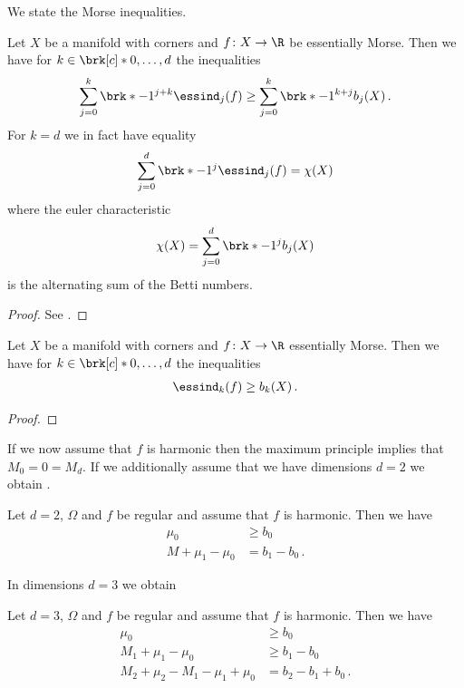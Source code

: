 We state the Morse inequalities.
\begin{theorem}
Let $X$ be a manifold with corners and $f\colon X\to\R$ be essentially Morse.
Then we have for $k\in\brk[c]*{0,\dots,d}$ the inequalities
\begin{align*}
  \sum_{j=0}^k \brk*{-1}^{j+k}\essind_j(f)\geq \sum_{j=0}^k\brk*{-1}^{k+j}b_j(X)\,.
\end{align*}
For $k=d$ we in fact have equality
\begin{align*}
  \sum_{j=0}^d \brk*{-1}^{j}\essind_j(f)= \chi(X)
\end{align*}
where the euler characteristic
\begin{align*}
  \chi(X)=\sum_{j=0}^d\brk*{-1}^{j}b_j(X)
\end{align*}
is the alternating sum of the Betti numbers.
\end{theorem}
\begin{proof}
  See \cite[Theorem 10.2']{Morse1969}.
\end{proof}

\begin{corollary}
  Let $X$ be a manifold with corners and $f\colon X\to\R$ essentially Morse. Then we have for $k\in\brk[c]*{0,\dots,d}$
  the inequalities
  \begin{align*}
    \essind_k(f)\geq b_k(X)\,.
  \end{align*}
\end{corollary}
\begin{proof}
\end{proof}
If we now assume that $f$ is harmonic then the maximum principle implies that
$M_0=0=M_d$.
If we additionally assume that we have dimensions $d=2$ we obtain \cite[Corollary 10.1]{Morse1969}.
\begin{corollary}[Morse inequalities for $f$ harmonic, $d=2$]
  Let $d=2$, $\Omega$ and $f$ be regular and assume that $f$ is harmonic. Then we have
  \begin{align*}
    \mu_0&\geq b_0 \\
    M+\mu_1-\mu_0&=b_1-b_0\,.
  \end{align*}
\end{corollary}
In dimensions $d=3$ we obtain \cite[Corollary 10.2]{Morse1969}
\begin{corollary}[Morse inequalities for $f$ harmonic, $d=3$]
  Let $d=3$, $\Omega$ and $f$ be regular and assume that $f$ is harmonic. Then we have
  \begin{align*}
    \mu_0&\geq b_0 \\
    M_1+\mu_1-\mu_0&\geq b_1-b_0 \\
    M_2+\mu_2-M_1-\mu_1+\mu_0&= b_2-b_1+b_0\,.
  \end{align*}
\end{corollary}

